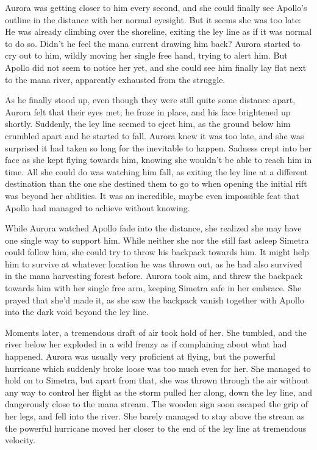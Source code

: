 \fancybreaker{}

Aurora was getting closer to him every second, and she could finally see Apollo's outline in the distance with her normal eyesight. But it seems she was too late: He was already climbing over the shoreline, exiting the ley line as if it was normal to do so. Didn't he feel the mana current drawing him back? Aurora started to cry out to him, wildly moving her single free hand, trying to alert him. But Apollo did not seem to notice her yet, and she could see him finally lay flat next to the mana river, apparently exhausted from the struggle.

As he finally stood up, even though they were still quite some distance apart, Aurora felt that their eyes met; he froze in place, and his face brightened up shortly. Suddenly, the ley line seemed to eject him, as the ground below him crumbled apart and he started to fall. Aurora knew it was too late, and she was surprised it had taken so long for the inevitable to happen. Sadness crept into her face as she kept flying towards him, knowing she wouldn't be able to reach him in time. All she could do was watching him fall, as exiting the ley line at a different destination than the one she destined them to go to when opening the initial rift was beyond her abilities. It was an incredible, maybe even impossible feat that Apollo had managed to achieve without knowing.

While Aurora watched Apollo fade into the distance, she realized she may have one single way to support him. While neither she nor the still fast asleep Simetra could follow him, she could try to throw his backpack towards him. It might help him to survive at whatever location he was thrown out, as he had also survived in the mana harvesting forest before. Aurora took aim, and threw the backpack towards him with her single free arm, keeping Simetra safe in her embrace. She prayed that she'd made it, as she saw the backpack vanish together with Apollo into the dark void beyond the ley line.

Moments later, a tremendous draft of air took hold of her. She tumbled, and the river below her exploded in a wild frenzy as if complaining about what had happened. Aurora was usually very proficient at flying, but the powerful hurricane which suddenly broke loose was too much even for her. She managed to hold on to Simetra, but apart from that, she was thrown through the air without any way to control her flight as the storm pulled her along, down the ley line, and dangerously close to the mana stream. The wooden sign soon escaped the grip of her legs, and fell into the river. She barely managed to stay above the stream as the powerful hurricane moved her closer to the end of the ley line at tremendous velocity.

